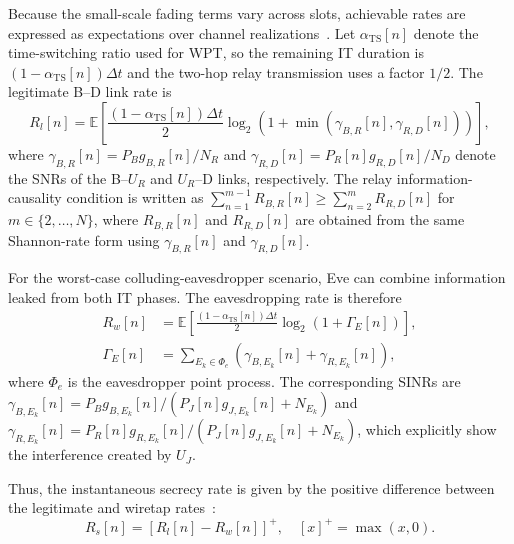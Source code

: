 \documentclass[journal]{IEEEtran}
\begin{document}
Because the small-scale fading terms vary across slots, achievable rates are expressed as expectations over channel realizations~\cite{pandeydualuav2026}. Let $\alpha_{\text{TS}}[n]$ denote the time-switching ratio used for WPT, so the remaining IT duration is $(1-\alpha_{\text{TS}}[n])\Delta t$ and the two-hop relay transmission uses a factor $1/2$. The legitimate B--D link rate is
\begin{equation}
R_l[n]=\mathbb{E}\left[\frac{(1-\alpha_{\text{TS}}[n])\Delta t}{2}\log_2\left(1+\min(\gamma_{B,R}[n],\gamma_{R,D}[n])\right)\right],
\label{eq:legitimate_rate}
\end{equation}
where $\gamma_{B,R}[n]=P_Bg_{B,R}[n]/N_R$ and $\gamma_{R,D}[n]=P_R[n]g_{R,D}[n]/N_D$ denote the SNRs of the B--$U_R$ and $U_R$--D links, respectively. The relay information-causality condition is written as $\sum_{n=1}^{m-1}R_{B,R}[n]\geq\sum_{n=2}^{m}R_{R,D}[n]$ for $m\in\{2,\ldots,N\}$, where $R_{B,R}[n]$ and $R_{R,D}[n]$ are obtained from the same Shannon-rate form using $\gamma_{B,R}[n]$ and $\gamma_{R,D}[n]$.

For the worst-case colluding-eavesdropper scenario, Eve can combine information leaked from both IT phases. The eavesdropping rate is therefore~\cite{pandeydualuav2026}
\begin{equation}
\begin{aligned}
R_w[n]
&=\mathbb{E}\left[\frac{(1-\alpha_{\text{TS}}[n])\Delta t}{2}
\log_2\left(1+\Gamma_E[n]\right)\right],\\
\Gamma_E[n]
&=\sum_{E_k\in\Phi_e}\left(\gamma_{B,E_k}[n]+\gamma_{R,E_k}[n]\right),
\end{aligned}
\label{eq:eaves_rate}
\end{equation}
where $\Phi_e$ is the eavesdropper point process. The corresponding SINRs are $\gamma_{B,E_k}[n]=P_Bg_{B,E_k}[n]/(P_J[n]g_{J,E_k}[n]+N_{E_k})$ and $\gamma_{R,E_k}[n]=P_R[n]g_{R,E_k}[n]/(P_J[n]g_{J,E_k}[n]+N_{E_k})$, which explicitly show the interference created by $U_J$.

Thus, the instantaneous secrecy rate is given by the positive difference between the legitimate and wiretap rates~\cite{pandey2022security, pandeydualuav2026}:
\begin{equation}
R_s[n]=[R_l[n]-R_w[n]]^+,\quad [x]^+=\max(x,0).
\label{eq:secrecy}
\end{equation}
\end{document}
